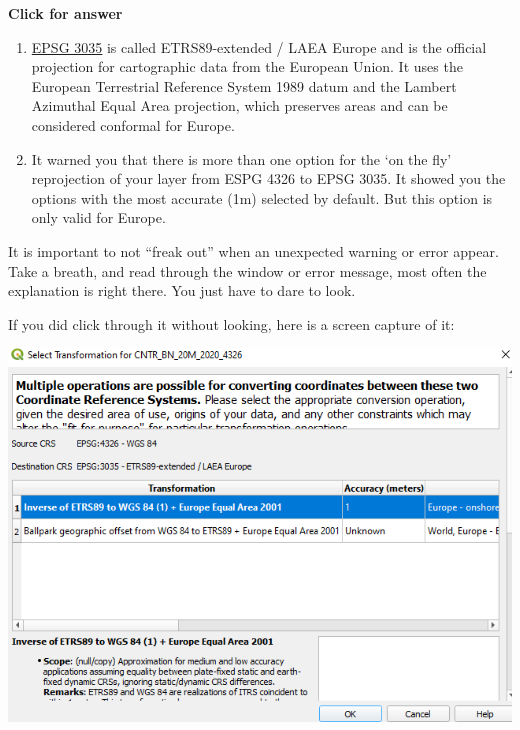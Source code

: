 \documentclass[
  letterpaper,
  DIV=11,
  numbers=noendperiod]{scrreprt}
\begin{document}
\begin{tcolorbox}[enhanced jigsaw, toprule=.15mm, breakable, left=2mm, colframe=quarto-callout-important-color-frame, colback=white, arc=.35mm, leftrule=.75mm, opacityback=0, rightrule=.15mm, bottomrule=.15mm]

\vspace{-3mm}\textbf{Click for answer}\vspace{3mm}

\begin{enumerate}
\def\labelenumi{\alph{enumi})}
\item
  \href{https://epsg.io/3035}{EPSG 3035} is called ETRS89-extended /
  LAEA Europe and is the official projection for cartographic data from
  the European Union. It uses the European Terrestrial Reference System
  1989 datum and the Lambert Azimuthal Equal Area projection, which
  preserves areas and can be considered conformal for Europe.
\item
  It warned you that there is more than one option for the `on the fly'
  reprojection of your layer from ESPG 4326 to EPSG 3035. It showed you
  the options with the most accurate (1m) selected by default. But this
  option is only valid for Europe.
\end{enumerate}

\end{tcolorbox}

It is important to not ``freak out'' when an unexpected warning or error
appear. Take a breath, and read through the window or error message,
most often the explanation is right there. You just have to dare to
look.

If you did click through it without looking, here is a screen capture of
it:

\includegraphics{images/lab_2/lab_2_img_5_crs_warning.png}
\end{document}
